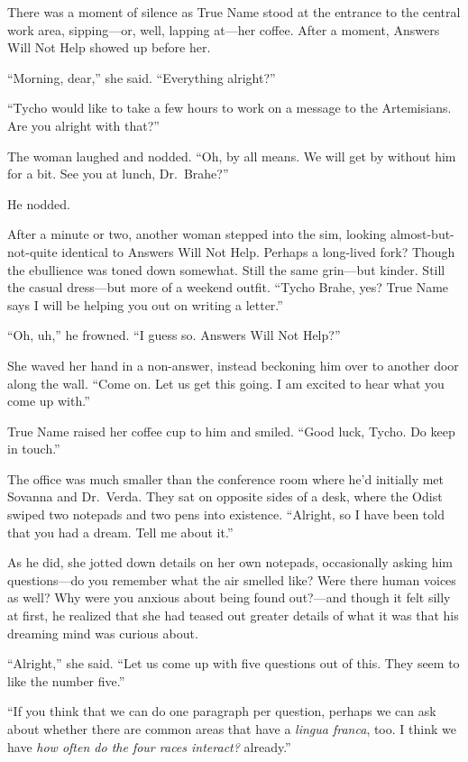 There was a moment of silence as True Name stood at the entrance to the central work area, sipping—or, well, lapping at—her coffee. After a moment, Answers Will Not Help showed up before her.

``Morning, dear,'' she said. ``Everything alright?''

``Tycho would like to take a few hours to work on a message to the Artemisians. Are you alright with that?''

The woman laughed and nodded. ``Oh, by all means. We will get by without him for a bit. See you at lunch, Dr.~Brahe?''

He nodded.

After a minute or two, another woman stepped into the sim, looking almost-but-not-quite identical to Answers Will Not Help. Perhaps a long-lived fork? Though the ebullience was toned down somewhat. Still the same grin—but kinder. Still the casual dress—but more of a weekend outfit. ``Tycho Brahe, yes? True Name says I will be helping you out on writing a letter.''

``Oh, uh,'' he frowned. ``I guess so. Answers Will Not Help?''

She waved her hand in a non-answer, instead beckoning him over to another door along the wall. ``Come on. Let us get this going. I am excited to hear what you come up with.''

True Name raised her coffee cup to him and smiled. ``Good luck, Tycho. Do keep in touch.''

The office was much smaller than the conference room where he'd initially met Sovanna and Dr.~Verda. They sat on opposite sides of a desk, where the Odist swiped two notepads and two pens into existence. ``Alright, so I have been told that you had a dream. Tell me about it.''

As he did, she jotted down details on her own notepads, occasionally asking him questions—do you remember what the air smelled like? Were there human voices as well? Why were you anxious about being found out?—and though it felt silly at first, he realized that she had teased out greater details of what it was that his dreaming mind was curious about.

``Alright,'' she said. ``Let us come up with five questions out of this. They seem to like the number five.''

``If you think that we can do one paragraph per question, perhaps we can ask about whether there are common areas that have a \emph{lingua franca}, too. I think we have \emph{how often do the four races interact?} already.''

